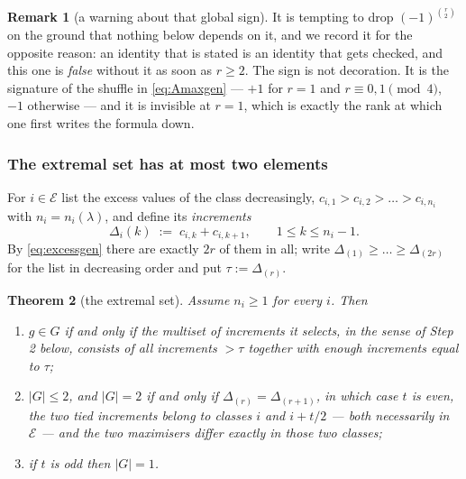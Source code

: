 \documentclass[11pt,reqno]{amsart}
\theoremstyle{plain}
\newtheorem{theorem}{Theorem}[section]
\theoremstyle{definition}
\newtheorem{remark}[theorem]{Remark}
\begin{document}
\begin{remark}[a warning about that global sign]
It is tempting to drop $(-1)^{\binom r2}$ on the ground that nothing below depends on it, and we
record it for the opposite reason: an identity that is stated is an identity that gets checked, and
this one is \emph{false} without it as soon as $r\ge2$. The sign is not decoration. It is the
signature of the shuffle in \eqref{eq:Amaxgen} --- $+1$ for $r=1$ and $r\equiv0,1 \pmod 4$, $-1$
otherwise --- and it is invisible at $r=1$, which is exactly the rank at which one first writes the
formula down.
\end{remark}

\subsubsection*{The extremal set has at most two elements}

For $i\in\mathcal{E}$ list the excess values of the class decreasingly,
$c_{i,1}>c_{i,2}>\dots>c_{i,n_i}$ with $n_i=n_i(\lambda)$, and define its \emph{increments}
\begin{equation}\label{eq:incrgen}
  \Delta_i(k)\;:=\;c_{i,k}+c_{i,k+1},\qquad 1\le k\le n_i-1 .
\end{equation}
By \eqref{eq:excessgen} there are exactly $2r$ of them in all; write
$\Delta_{(1)}\ge\dots\ge\Delta_{(2r)}$ for the list in decreasing order and put
$\tau:=\Delta_{(r)}$.

\begin{theorem}[the extremal set]\label{thm:Ggen}
Assume $n_i\ge1$ for every $i$. Then
\begin{enumerate}
\item[\rm(a)] $g\in G$ if and only if the multiset of increments it selects, in the sense of Step 2
below, consists of all increments $>\tau$ together with enough increments equal to $\tau$;
\item[\rm(b)] $|G|\le2$, and $|G|=2$ if and only if $\Delta_{(r)}=\Delta_{(r+1)}$, in which case $t$
is even, the two tied increments belong to classes $i$ and $i+t/2$ --- both necessarily in
$\mathcal{E}$ --- and the two maximisers differ exactly in those two classes;
\item[\rm(c)] if $t$ is odd then $|G|=1$.
\end{enumerate}
\end{theorem}
\end{document}
